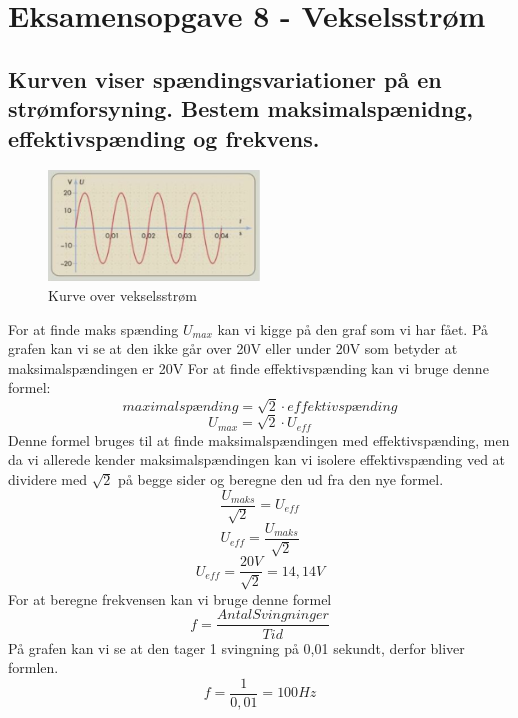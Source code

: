 \newpage
\section{Eksamensopgave 8 - Vekselsstrøm}
\subsection{Kurven viser spændingsvariationer på en strømforsyning. Bestem maksimalspænidng, effektivspænding og frekvens.}
\begin{figure}[h!]
    \centering
    \includegraphics[width=0.5\textwidth]{figures/vekselsstrom.png}
    \caption{Kurve over vekselsstrøm}
\end{figure}
For at finde maks spænding \begin{math}U_{max}\end{math} kan vi kigge på den graf som vi har fået. På grafen kan vi se at den ikke går over 20V eller under 20V som betyder at maksimalspændingen er 20V\newline
For at finde effektivspænding kan vi bruge denne formel:
\begin{equation*}
    maximalspænding = \sqrt{2}\cdot effektivspænding
\end{equation*}
\begin{equation*}
    U_{max} = \sqrt{2}\cdot U_{eff}
\end{equation*}
Denne formel bruges til at finde maksimalspændingen med effektivspænding, men da vi allerede kender maksimalspændingen kan vi isolere effektivspænding ved at dividere med \begin{math}\sqrt{2}\end{math} på begge sider og beregne den ud fra den nye formel.
\begin{equation*}
    \frac{U_{maks}}{\sqrt{2}}=U_{eff}
\end{equation*}
\begin{equation*}
    U_{eff}=\frac{U_{maks}}{\sqrt{2}}
\end{equation*}
\begin{equation*}
    U_{eff}=\frac{20V}{\sqrt{2}}=14,14V
\end{equation*}
For at beregne frekvensen kan vi bruge denne formel
\begin{equation*}
    f=\frac{Antal Svingninger}{Tid}
\end{equation*}
På grafen kan vi se at den tager 1 svingning på 0,01 sekundt, derfor bliver formlen.
\begin{equation*}
    f=\frac{1}{0,01}=100Hz
\end{equation*}

